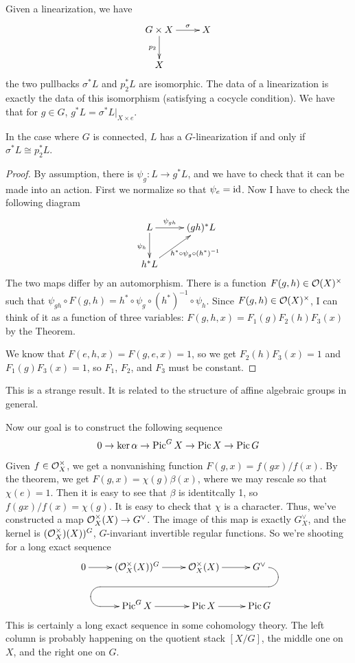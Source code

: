 Given a linearization, we have
\[\xymatrix{
 G\times X\ar[r]^-\sigma \ar[d]_{p_2} & X\\
 X
}\]
the two pullbacks $\sigma^* L$ and $p_2^* L$ are isomorphic. The data of a linearization is exactly the data of this isomorphism (satisfying a cocycle condition). We have that for $g\in G$, $g^* L=\sigma^* L|_{X\times e}$.
\begin{proposition}
 In the case where $G$ is connected, $L$ has a $G$-linearization if and only if $\sigma^* L\cong p_2^* L$. 
\end{proposition}
\begin{proof}
 By assumption, there is $\psi_g\colon L\to g^* L$, and we have to check that it can be made into an action. First we normalize so that $\psi_e=\operatorname{id}$. Now I have to check the following diagram
 \[\xymatrix{
   L\ar[d]_{\psi_h}\ar[r]^-{\psi_{gh}} & (gh)^* L\\
   h^*L\ar[ur]_{h^*\circ \psi_g\circ (h^*)^{-1}}
 }\]
 The two maps differ by an automorphism. There is a function $F(g,h)\in \mathcal{O}(X)^\times$ such that $\psi_{gh}\circ F(g,h)=h^*\circ \psi_g\circ (h^*)^{-1}\circ \psi_h$. Since $F(g,h)\in \mathcal{O}(X)^\times$, I can think of it as a function of three variables: $F(g,h,x)=F_1(g)F_2(h)F_3(x)$ by the Theorem.
 
 We know that $F(e,h,x)=F(g,e,x)=1$, so we get $F_2(h)F_3(x)=1$ and $F_1(g)F_3(x)=1$, so $F_1$, $F_2$, and $F_3$ must be constant. 
\end{proof}
This is a strange result. It is related to the structure of affine algebraic groups in general.

Now our goal is to construct the following sequence
\[
 0\to \ker \alpha\to \operatorname{Pic}^G X\to \operatorname{Pic} X\to \operatorname{Pic} G
\]
\begin{remark}
 Given $f\in \mathcal{O}_X^\times$, we get a nonvanishing function $F(g,x)=f(gx)/f(x)$. By the theorem, we get $F(g,x)=\chi(g)\beta(x)$, where we may rescale so that $\chi(e)=1$. Then it is easy to see that $\beta$ is identitcally 1, so $f(gx)/f(x)=\chi(g)$. It is easy to check that $\chi$ is a character. Thus, we've constructed a map $\mathcal{O}_X^\times(X)\to G^\vee$. The image of this map is exactly $G_X^\vee$, and the kernel is $(\mathcal{O}_X^\times)(X))^G$, $G$-invariant invertible regular functions. So we're shooting for a long exact sequence
 \[\xymatrix{
  0\ar[r] & (\O_X^\times(X))^G \ar[r] & \O_X^\times(X)\ar[r] & G^\vee \ar`r[d]`[l]`p+<-15.5pc,-4pc>`[dll][dll] \\
  & \pic^G X \ar[r] & \pic X\ar[r] & \pic G
 }\]
 This is certainly a long exact sequence in some cohomology theory. The left column is probably happening on the quotient stack $[X/G]$, the middle one on $X$, and the right one on $G$.
\end{remark}

